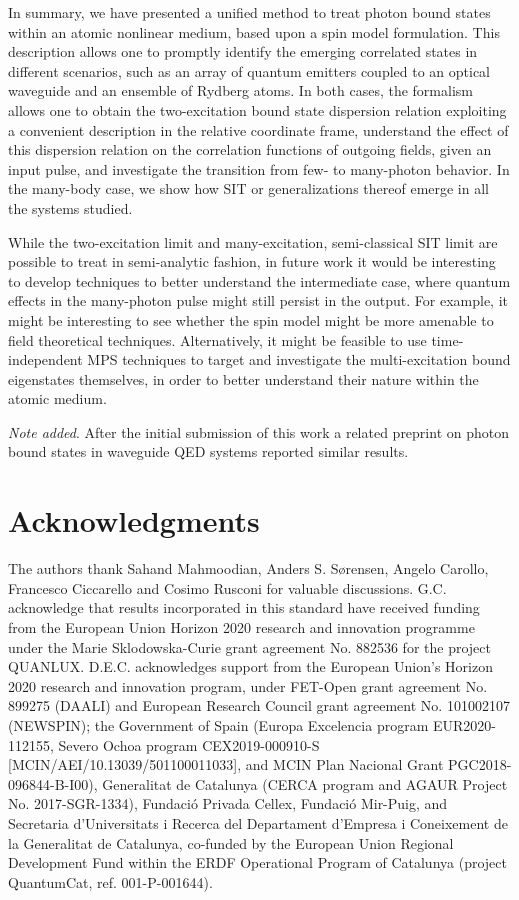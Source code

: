 \documentclass[pra,twocolumn,showpacs,preprintnumbers,amsmath,amssymb]{revtex4-1}
\begin{document}
In summary, we have presented a unified method to treat photon bound states within an atomic nonlinear medium, based upon a spin model formulation. This description  allows one to promptly identify the emerging correlated states in different  scenarios, such as an array of quantum emitters coupled to an optical waveguide and an ensemble of Rydberg atoms. In both cases, the formalism allows one to obtain the two-excitation bound state dispersion relation exploiting a convenient description in the relative coordinate frame, understand the effect of this dispersion relation on the correlation functions of outgoing fields, given an input pulse, and investigate the transition from few- to many-photon behavior. In the many-body case, we show how SIT or generalizations thereof emerge in all the systems studied. 

While the two-excitation limit and many-excitation, semi-classical SIT limit are possible to treat in semi-analytic fashion, in future work it would be interesting to develop techniques to better understand the intermediate case, where quantum effects in the many-photon pulse might still persist in the output. For example, it might be interesting to see whether the spin model might be more amenable to field theoretical techniques. Alternatively, it might be feasible to use time-independent MPS techniques to target and investigate the multi-excitation bound eigenstates themselves, in order to better understand their nature within the atomic medium.

\emph{Note added}. After the initial submission of this work a related preprint on photon bound states in waveguide QED systems  \cite{SorenwqedBS} reported similar results.



\section*{Acknowledgments}
The authors thank Sahand Mahmoodian, Anders S. S{\o}rensen, Angelo Carollo, Francesco Ciccarello  and Cosimo Rusconi for valuable discussions. G.C. acknowledge that results incorporated in this standard have received funding from the European Union Horizon 2020 research and innovation programme under the Marie Sklodowska-Curie grant agreement No. 882536 for the project QUANLUX.
D.E.C. acknowledges support from the European Union's Horizon 2020 research and innovation program, under FET-Open grant agreement No. 899275 (DAALI) and  European Research Council grant agreement No. 101002107 (NEWSPIN); the Government of Spain (Europa Excelencia program EUR2020-112155, Severo Ochoa program CEX2019-000910-S [MCIN/AEI/10.13039/501100011033], and MCIN Plan Nacional Grant PGC2018-096844-B-I00), Generalitat de Catalunya (CERCA program and AGAUR Project No. 2017-SGR-1334), Fundaci\'o Privada Cellex, Fundaci\'o Mir-Puig, and Secretaria d'Universitats i Recerca del Departament d'Empresa i Coneixement de la Generalitat de Catalunya, co-funded by the European Union Regional Development Fund within the ERDF Operational Program of Catalunya (project QuantumCat, ref. 001-P-001644).
\end{document}

